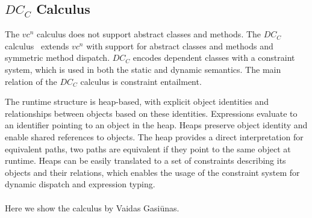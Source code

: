 \subsection{$DC_C$ Calculus}
\label{sec:dcc}
The $vc^n$ calculus does not support abstract classes and methods.
The $DC_C$ calculus~\cite{vaidas:thesis} extends $vc^n$ with support for abstract classes and methods
and symmetric method dispatch.
$DC_C$ encodes dependent classes with a constraint system,
which is used in both the static and dynamic semantics.
The main relation of the $DC_C$ calculus is constraint entailment.

The runtime structure is heap-based,
with explicit object identities
and relationships between objects based on these identities.
Expressions evaluate to an identifier pointing to an object in the heap.
Heaps preserve object identity and enable shared references to objects.
The heap provides a direct interpretation for equivalent paths,
two paths are equivalent if they point to the same object at runtime.
Heaps can be easily translated to a set of constraints describing its objects and their relations,
which enables the usage of the constraint system for dynamic dispatch and expression typing.
\\ \\
Here we show the calculus by Vaidas Gasiūnas.

